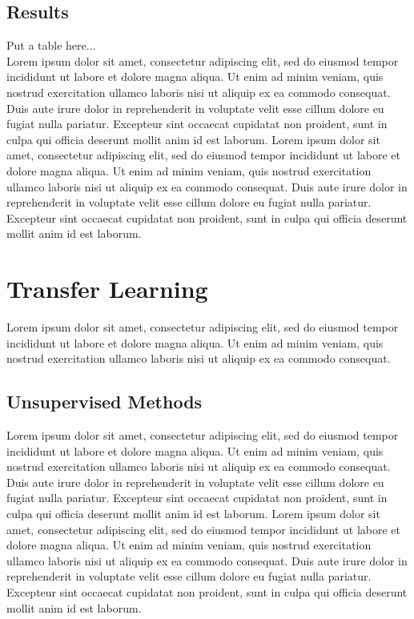 \documentclass[12pt]{article}
\begin{document}
\subsection{Results}
Put a table here...\\

Lorem ipsum dolor sit amet, consectetur adipiscing elit, sed do eiusmod tempor incididunt ut labore et dolore magna aliqua. Ut enim ad minim veniam, quis nostrud exercitation ullamco laboris nisi ut aliquip ex ea commodo consequat. Duis aute irure dolor in reprehenderit in voluptate velit esse cillum dolore eu fugiat nulla pariatur. Excepteur sint occaecat cupidatat non proident, sunt in culpa qui officia deserunt mollit anim id est laborum. Lorem ipsum dolor sit amet, consectetur adipiscing elit, sed do eiusmod tempor incididunt ut labore et dolore magna aliqua. Ut enim ad minim veniam, quis nostrud exercitation ullamco laboris nisi ut aliquip ex ea commodo consequat. Duis aute irure dolor in reprehenderit in voluptate velit esse cillum dolore eu fugiat nulla pariatur. Excepteur sint occaecat cupidatat non proident, sunt in culpa qui officia deserunt mollit anim id est laborum.


\section{Transfer Learning}
Lorem ipsum dolor sit amet, consectetur adipiscing elit, sed do eiusmod tempor incididunt ut labore et dolore magna aliqua. Ut enim ad minim veniam, quis nostrud exercitation ullamco laboris nisi ut aliquip ex ea commodo consequat.

\subsection{Unsupervised Methods}
Lorem ipsum dolor sit amet, consectetur adipiscing elit, sed do eiusmod tempor incididunt ut labore et dolore magna aliqua. Ut enim ad minim veniam, quis nostrud exercitation ullamco laboris nisi ut aliquip ex ea commodo consequat. Duis aute irure dolor in reprehenderit in voluptate velit esse cillum dolore eu fugiat nulla pariatur. Excepteur sint occaecat cupidatat non proident, sunt in culpa qui officia deserunt mollit anim id est laborum. Lorem ipsum dolor sit amet, consectetur adipiscing elit, sed do eiusmod tempor incididunt ut labore et dolore magna aliqua. Ut enim ad minim veniam, quis nostrud exercitation ullamco laboris nisi ut aliquip ex ea commodo consequat. Duis aute irure dolor in reprehenderit in voluptate velit esse cillum dolore eu fugiat nulla pariatur. Excepteur sint occaecat cupidatat non proident, sunt in culpa qui officia deserunt mollit anim id est laborum.
\end{document}
